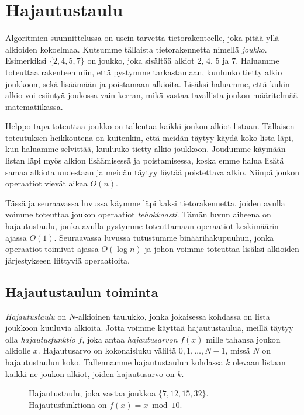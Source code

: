 \chapter{Hajautustaulu}

Algoritmien suunnittelussa on usein tarvetta
tietorakenteelle, joka pitää yllä alkioiden kokoelmaa.
Kutsumme tällaista tietorakennetta nimellä \emph{joukko}.
Esimerkiksi $\{2,4,5,7\}$ on joukko, joka sisältää
alkiot $2$, $4$, $5$ ja $7$.
Haluamme toteuttaa rakenteen niin,
että pystymme tarkastamaan, kuuluuko tietty alkio
joukkoon, sekä lisäämään ja poistamaan alkioita.
Lisäksi haluamme,
että kukin alkio voi esiintyä joukossa vain kerran,
mikä vastaa tavallista joukon määritelmää matematiikassa.

Helppo tapa toteuttaa joukko on tallentaa
kaikki joukon alkiot listaan.
Tällaisen toteutuksen heikkoutena on kuitenkin,
että meidän täytyy käydä koko lista läpi,
kun haluamme selvittää, kuuluuko tietty alkio joukkoon.
Joudumme käymään listan läpi myös alkion lisäämisessä ja
poistamisessa, koska emme halua lisätä samaa alkiota
uudestaan ja meidän täytyy löytää poistettava alkio.
Niinpä joukon operaatiot vievät aikaa $O(n)$.

Tässä ja seuraavassa luvussa käymme läpi kaksi
tietorakennetta, joiden avulla voimme toteuttaa
joukon operaatiot \emph{tehokkaasti}.
Tämän luvun aiheena on hajautustaulu,
jonka avulla pystymme toteuttamaan operaatiot
keskimäärin ajassa $O(1)$.
Seuraavassa luvussa tutustumme binäärihaku\-puuhun,
jonka operaatiot toimivat ajassa $O(\log n)$
ja johon voimme toteuttaa lisäksi alkioiden järjestykseen
liittyviä operaatioita.

\section{Hajautustaulun toiminta}

\emph{Hajautustaulu} on $N$-alkioinen taulukko,
jonka jokaisessa kohdassa on lista joukkoon kuuluvia alkioita.
Jotta voimme käyttää hajautustaulua,
meillä täytyy olla \emph{hajautusfunktio} $f$,
joka antaa \emph{hajautusarvon}
$f(x)$ mille tahansa joukon alkiolle $x$.
Hajautusarvo on kokonaisluku väliltä
$0,1,\dots,N-1$, missä $N$ on hajautustaulun koko.
Tallennamme hajautustaulun kohdassa $k$ olevaan listaan
kaikki ne joukon alkiot, joiden hajautusarvo on $k$.

\begin{figure}
\caption{Hajautustaulu, joka vastaa joukkoa $\{7,12,15,32\}$.
Hajautusfunktiona on $f(x)=x \bmod 10$.}
\label{fig:hajtau}
\end{figure}


